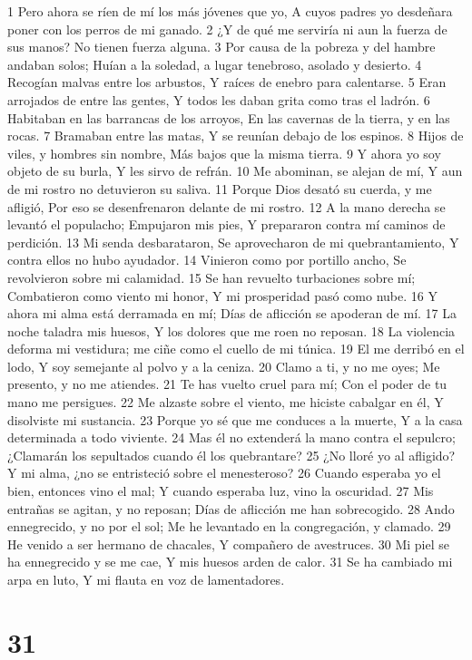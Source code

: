 1 Pero ahora se ríen de mí los más jóvenes que yo,
A cuyos padres yo desdeñara poner con los perros de mi ganado.
2 ¿Y de qué me serviría ni aun la fuerza de sus manos?
No tienen fuerza alguna.
3 Por causa de la pobreza y del hambre andaban solos;
Huían a la soledad, a lugar tenebroso, asolado y desierto.
4 Recogían malvas entre los arbustos,
Y raíces de enebro para calentarse.
5 Eran arrojados de entre las gentes,
Y todos les daban grita como tras el ladrón.
6 Habitaban en las barrancas de los arroyos,
En las cavernas de la tierra, y en las rocas.
7 Bramaban entre las matas,
Y se reunían debajo de los espinos.
8 Hijos de viles, y hombres sin nombre,
Más bajos que la misma tierra.
9 Y ahora yo soy objeto de su burla,
Y les sirvo de refrán.
10 Me abominan, se alejan de mí,
Y aun de mi rostro no detuvieron su saliva.
11 Porque Dios desató su cuerda, y me afligió, 
Por eso se desenfrenaron delante de mi rostro.
12 A la mano derecha se levantó el populacho;
Empujaron mis pies,
Y prepararon contra mí caminos de perdición.
13 Mi senda desbarataron,
Se aprovecharon de mi quebrantamiento,
Y contra ellos no hubo ayudador.
14 Vinieron como por portillo ancho,
Se revolvieron sobre mi calamidad.
15 Se han revuelto turbaciones sobre mí;
Combatieron como viento mi honor,
Y mi prosperidad pasó como nube.
16 Y ahora mi alma está derramada en mí;
Días de aflicción se apoderan de mí.
17 La noche taladra mis huesos,
Y los dolores que me roen no reposan.
18 La violencia deforma mi vestidura; me ciñe como el cuello de mi túnica.
19 El me derribó en el lodo,
Y soy semejante al polvo y a la ceniza.
20 Clamo a ti, y no me oyes;
Me presento, y no me atiendes.
21 Te has vuelto cruel para mí;
Con el poder de tu mano me persigues.
22 Me alzaste sobre el viento, me hiciste cabalgar en él,
Y disolviste mi sustancia.
23 Porque yo sé que me conduces a la muerte,
Y a la casa determinada a todo viviente.
24 Mas él no extenderá la mano contra el sepulcro;
¿Clamarán los sepultados cuando él los quebrantare?
25 ¿No lloré yo al afligido?
Y mi alma, ¿no se entristeció sobre el menesteroso?
26 Cuando esperaba yo el bien, entonces vino el mal;
Y cuando esperaba luz, vino la oscuridad.
27 Mis entrañas se agitan, y no reposan;
Días de aflicción me han sobrecogido.
28 Ando ennegrecido, y no por el sol;
Me he levantado en la congregación, y clamado.
29 He venido a ser hermano de chacales,
Y compañero de avestruces.
30 Mi piel se ha ennegrecido y se me cae,
Y mis huesos arden de calor.
31 Se ha cambiado mi arpa en luto,
Y mi flauta en voz de lamentadores.

\chapter{31}

